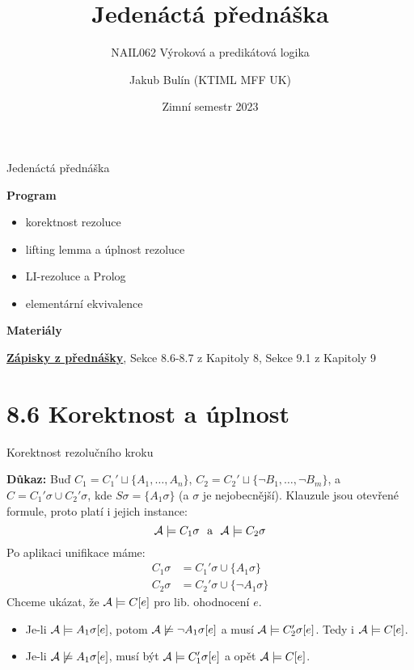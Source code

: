 \documentclass{beamer}
\title{Jedenáctá přednáška}
\subtitle{NAIL062 Výroková a predikátová logika}
\author{Jakub Bulín (KTIML MFF UK)}
\date{Zimní semestr 2023}
\begin{document}
\frame{\titlepage}


\begin{frame}{Jedenáctá přednáška}

    \textbf{Program}
        \begin{itemize}
            \item korektnost rezoluce
            \item lifting lemma a úplnost rezoluce
            \item LI-rezoluce a Prolog
            \item elementární ekvivalence
        \end{itemize}

    \textbf{Materiály}

        \href{https://github.com/jbulin-mff-uk/nail062/raw/main/lecture/lecture-notes/lecture-notes.pdf}{\alert{\textbf{Zápisky z přednášky}}}, Sekce 8.6-8.7 z Kapitoly 8, Sekce 9.1 z Kapitoly 9

\end{frame}


\section{8.6 Korektnost a úplnost}


\begin{frame}{Korektnost rezolučního kroku}


    \textbf{Důkaz:} Buď $C_1=C_1'\sqcup \{A_1,\dots,A_n\}$, $C_2=C_2'\sqcup \{\neg B_1,\dots,\neg B_m\}$, a $C=C_1'\sigma \cup C_2'\sigma$, kde $S\sigma=\{A_1\sigma\}$ (a $\sigma$ je
    nejobecnější). Klauzule jsou otevřené formule, proto platí i jejich instance:     
    $$
    \A\models C_1\sigma\ \text{ a }\ \A\models C_2\sigma
    $$     
    Po aplikaci unifikace máme: 
    \begin{align*}        
        C_1\sigma&=C_1'\sigma \cup \{A_1\sigma\}\\
        C_2\sigma&=C_2'\sigma \cup \{\neg A_1\sigma\}        
    \end{align*}
    Chceme ukázat, že $\mathcal{A}\models C[e]$ pro lib. ohodnocení $e$. 
    \begin{itemize}
        \item Je-li \alert{$\mathcal{A}\models A_1\sigma[e]$}, potom $\mathcal{A}\not\models\neg A_1\sigma[e]$ a musí \alert{$\mathcal{A}\models C_2'\sigma[e]$}. Tedy i $\mathcal{A}\models C[e]$. 
        \item Je-li \alert{$\mathcal{A}\not\models A_1\sigma[e]$}, musí být \alert{$\mathcal{A}\models C_1'\sigma[e]$} a opět $\mathcal{A}\models C[e]$. \hfill\qedsymbol
    \end{itemize}    

\end{frame}
\end{document}

